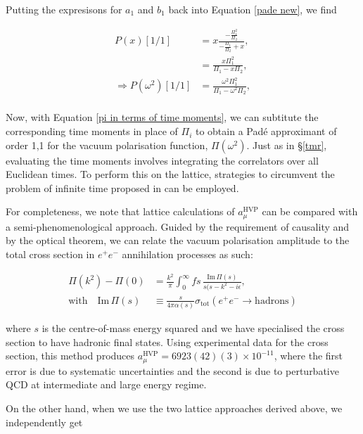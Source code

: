 \documentclass{article}
\numberwithin{equation}{section} %
\begin{document}
\noindent Putting the expresisons for $a_1$ and $b_1$ back into Equation \ref{pade new}, we find

\begin{equation}
\begin{split}
P(x)[1/1] &= x \frac{-\frac{\Pi_1^2}{\Pi_2}}{-\frac{\Pi_1}{\Pi_2}+x},\\
&= \frac{x\Pi_1^2}{\Pi_1-x\Pi_2},\\
\Rightarrow P(\omega^2)[1/1]&= \frac{\omega^2\Pi_1^2}{\Pi_1-\omega^2\Pi_2},\\
\end{split}
\label{pade 11}
\end{equation}

Now, with Equation \ref{pi in terms of time moments}, we can subtitute the corresponding time moments in place of $\Pi_i$ to obtain a Pad\'e approximant of order 1,1 for the vacuum polarisation function, $\Pi(\omega^2)$. Just as in \S \ref{tmr}, evaluating the time moments involves integrating the correlators over all Euclidean times. To perform this on the lattice, strategies to circumvent the problem of infinite time proposed in \cite{dellamorte} can be employed.

For completeness, we note that lattice calculations of $a_\mu^\mathrm{HVP}$ can be compared with a semi-phenomenological approach. Guided by the requirement of causality\cite{lehnerg2} and by the optical theorem\cite{jackson}, we can relate the vacuum polarisation amplitude to the total cross section in $e^+e^-$ annihilation processes as such:

\begin{equation}
\begin{split}
\Pi(k^2) - \Pi(0) &= \frac{k^2}{\pi}\int^\infty_0 fs\, \frac{\mathrm{Im}\, \Pi(s)}{s(s-k^2-i\epsilon},\\
\mathrm{with} \quad\mathrm{Im} \, \Pi(s) &\equiv \frac{s}{4\pi\alpha(s)}\sigma_\mathrm{tot}(e^+e^-\rightarrow \mathrm{hadrons})
\end{split}
\end{equation}

\noindent where $s$ is the centre-of-mass energy squared and we have specialised the cross section to have hadronic final states. Using experimental data for the cross section, this method produces $a_\mu^\mathrm{HVP}=6923(42)(3)\times 10^{-11}$, where the first error is due to systematic uncertainties and the second is due to perturbative QCD at intermediate and large energy regime\cite{hoecker}.

On the other hand, when we use the two lattice approaches derived above, we independently get\cite{dellamorte}
\end{document}
